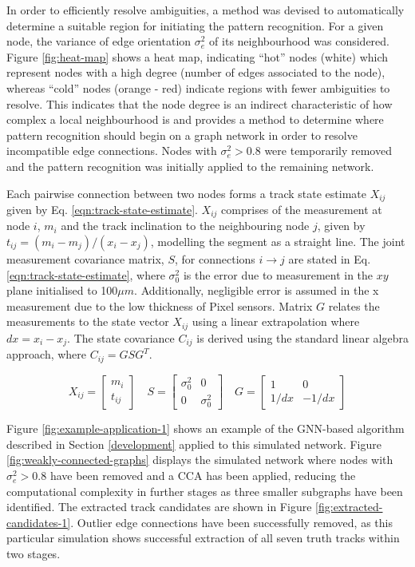 In order to efficiently resolve ambiguities, a method was devised to automatically determine a suitable region for initiating the pattern recognition. For a given node, the variance of edge orientation $\sigma_e^2$ of its neighbourhood was considered. Figure \ref{fig:heat-map} shows a heat map, indicating ``hot'' nodes (white) which represent nodes with a high degree (number of edges associated to the node), whereas ``cold'' nodes (orange - red) indicate regions with fewer ambiguities to resolve. This indicates that the node degree is an indirect characteristic of how complex a local neighbourhood is and provides a method to determine where pattern recognition should begin on a graph network in order to resolve incompatible edge connections. Nodes with $\sigma_e^2 > 0.8$ were temporarily removed and the pattern recognition was initially applied to the remaining network.

Each pairwise connection between two nodes forms a track state estimate $X_{ij}$ given by Eq. \eqref{eqn:track-state-estimate}. $X_{ij}$ comprises of the measurement at node $i$, $m_i$ and the track inclination to the neighbouring node $j$, given by $t_{ij} = (m_i - m_j) / (x_i - x_j)$, modelling the segment as a straight line. The joint measurement covariance matrix, $S$, for connections $i \rightarrow j$ are stated in Eq. \eqref{eqn:track-state-estimate}, where $\sigma_0^{2}$ is the error due to measurement in the $xy$ plane initialised to 100$\mu m$. Additionally, negligible error is assumed in the x measurement due to the low thickness of Pixel sensors. Matrix $G$ relates the measurements to the state vector $X_{ij}$ using a linear extrapolation where $dx = x_i - x_j$. The state covariance $C_{ij}$ is derived using the standard linear algebra approach, where $C_{ij} = GSG^T$. 

\begin{equation}
X_{ij} = \begin{bmatrix} m_i \\ t_{ij} \end{bmatrix} \quad S = \begin{bmatrix} \sigma_0^{2} & 0 \\ 0 & \sigma_0^{2} \end{bmatrix}  \quad G = \begin{bmatrix} 1 & 0 \\ 1/dx & -1/dx  \end{bmatrix}
\label{eqn:track-state-estimate}
\end{equation}

Figure \ref{fig:example-application-1} shows an example of the GNN-based algorithm described in Section \ref{development} applied to this simulated network. Figure \ref{fig:weakly-connected-graphs} displays the simulated network where nodes with $\sigma_e^2 > 0.8$ have been removed and a CCA has been applied, reducing the computational complexity in further stages as three smaller subgraphs have been identified. The extracted track candidates are shown in Figure \ref{fig:extracted-candidates-1}. Outlier edge connections have been successfully removed, as this particular simulation shows successful extraction of all seven truth tracks within two stages.

